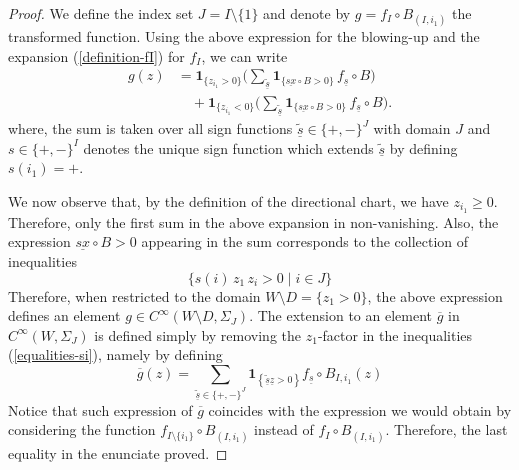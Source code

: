 \documentclass[11pt,psamsfonts]{article}
\newcommand{\tmmathbf}[1]{\ensuremath{\boldsymbol{#1}}}
\theoremstyle{definition}
\theoremstyle{remark}
\begin{document}
\begin{proof}
We define the index set $J = I
  \setminus \{ 1 \}$ and denote by $g = f_I \circ
  B_{(I, i_1)}$ the transformed function. Using the above expression for the blowing-up and the
  expansion (\ref{definition-fI}) for $f_I$, we can write
  \begin{align*}
g(z) &= 
\tmmathbf{1}_{\{ z_{i_1} > 0 \}}
\Biggl(
  \sum_{\underline{\tilde s}}
  \tmmathbf{1}_{\{ \underline{s x} \circ B > 0 \}}
  \, f_{\underline{s}} \circ B
\Biggr) \\[4pt]
&\quad + 
\tmmathbf{1}_{\{ z_{i_1} < 0 \}}
\Biggl(
  \sum_{\underline{\tilde s}}
  \tmmathbf{1}_{\{ \underline{s x} \circ B > 0 \}}
  \, f_{{\underline{s}}} \circ B
\Biggr).
\end{align*}
 where, the sum is taken over all sign functions $\underline{\tilde{s}}\in \{ +, - \}^J$ with domain $J$ and $s\in \{ +, - \}^I$ denotes the unique sign
  function which extends $\underline{\tilde{s}}$ by defining
  $s(i_1) = +$.
  
  We now observe that, by the definition of the directional chart, we have $z_{i_1}\geqslant 0$.
  Therefore, only the first sum in the above expansion in non-vanishing.
 Also, the expression $\underline{s x} \circ B > 0$ appearing in the sum
  corresponds to the collection of inequalities
  \begin{equation}
    \{ s (i)\, z_1\, z_i > 0 \mid i \in J \} \label{equalities-si}
  \end{equation}
  Therefore, when restricted to the domain $W\setminus D = \{ z_1 > 0 \}$, the above
  expression defines an element $g \in C^{\infty} (W \setminus D, \Sigma_J)$. The
  extension to an element $\overline{g}$ in $C^{\infty} (W, \Sigma_J)$ is 
  defined simply by removing the $z_1$-factor in the inequalities
  (\ref{equalities-si}), namely by defining
  \[ \overline{g} (z) = \sum_{\underline{\tilde s} \in \{ +, - \}^J} \tmmathbf{1}_{\left\{ \underline{\tilde s} 
     \underline{z} > 0 \right\}} f_{{\underline{s}}} \circ B_{I,i_1} (z) \]
 Notice that such expression of $\overline{g}$ coincides with the expression we would obtain by considering the function $f_{I \setminus \{ i_1 \}} \circ B_{(I, i_1)}$ instead of $f_{I} \circ B_{(I, i_1)}$.   Therefore, the last equality in the enunciate proved.
\end{proof}
\end{document}
